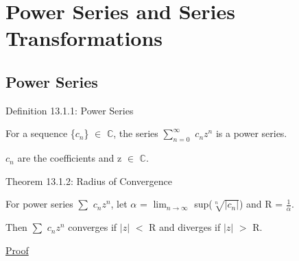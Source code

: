 \newpage

\section[Day 13: Power Series \& Series Transformations]
{Power Series and Series Transformations}

\subsection{ Power Series }

{ \color{blue} Definition 13.1.1: Power Series }

    \begin{adjustbox}{minipage=14cm, right, vspace=0.1cm 0cm}
        For a sequence \{$c_n$\} $\in$ $\mathbb{C}$, the series
        $\sum_{n=0}^{\infty}$ $c_n z^n$
        is a power series.

        $c_n$ are the coefficients and z $\in$ $\mathbb{C}$.
    \end{adjustbox}

    \vspace{0.5cm}

{ \color{red} Theorem 13.1.2: Radius of Convergence }

    \begin{adjustbox}{minipage=14cm, right, vspace=0.1cm 0cm}
        For power series $\sum$ $c_n z^n$, let
        $\alpha$ = $\lim_{n \rightarrow \infty}$ sup($\sqrt[n]{|c_n|}$)
        and R = $\frac{1}{\alpha}$.

        Then $\sum$ $c_n z^n$ converges if $|z|$ $<$ R and
        diverges if $|z|$ $>$ R.
    \end{adjustbox}

{ \color{magenta} \underline{Proof} }






